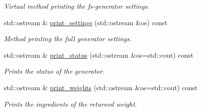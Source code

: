 \begin{DoxyCompactItemize}
\begin{DoxyCompactList}\small\item\em Virtual method printing the fs-\/generator settings. \end{DoxyCompactList}\item 
\hypertarget{a00450_afe993ba556fa067fcb43d991d3de9bb9}{}std\+::ostream \& \hyperlink{a00450_afe993ba556fa067fcb43d991d3de9bb9}{print\+\_\+settings} (std\+::ostream \&os) const \label{a00450_afe993ba556fa067fcb43d991d3de9bb9}

\begin{DoxyCompactList}\small\item\em Method printing the full generator settings. \end{DoxyCompactList}\item 
\hypertarget{a00450_a31c6a962ec9c6b3e3855e4348d7b58e2}{}std\+::ostream \& \hyperlink{a00450_a31c6a962ec9c6b3e3855e4348d7b58e2}{print\+\_\+status} (std\+::ostream \&os=std\+::cout) const \label{a00450_a31c6a962ec9c6b3e3855e4348d7b58e2}

\begin{DoxyCompactList}\small\item\em Prints the status of the generator. \end{DoxyCompactList}\item 
\hypertarget{a00450_a47ee5d1c63a2e1a47b8ba265da0d34d2}{}std\+::ostream \& \hyperlink{a00450_a47ee5d1c63a2e1a47b8ba265da0d34d2}{print\+\_\+weights} (std\+::ostream \&os=std\+::cout) const \label{a00450_a47ee5d1c63a2e1a47b8ba265da0d34d2}

\begin{DoxyCompactList}\small\item\em Prints the ingredients of the returned weight. \end{DoxyCompactList}\end{DoxyCompactItemize}
